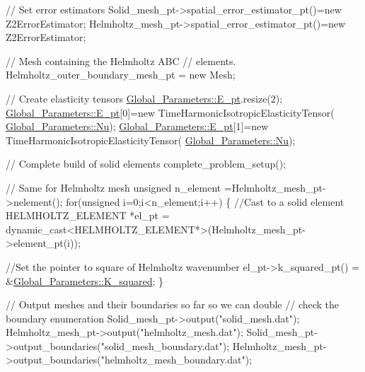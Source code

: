 \begin{DoxyCodeInclude}
 \textcolor{comment}{// Set error estimators}
 Solid\_mesh\_pt->spatial\_error\_estimator\_pt()=\textcolor{keyword}{new} Z2ErrorEstimator;
 Helmholtz\_mesh\_pt->spatial\_error\_estimator\_pt()=\textcolor{keyword}{new} Z2ErrorEstimator;

 \textcolor{comment}{// Mesh containing the Helmholtz ABC}
 \textcolor{comment}{// elements. }
 Helmholtz\_outer\_boundary\_mesh\_pt = \textcolor{keyword}{new} Mesh;

 \textcolor{comment}{// Create elasticity tensors}
 \hyperlink{namespaceGlobal__Parameters_a73c731fa617a9d92851e4195493262e7}{Global\_Parameters::E\_pt}.resize(2);
 \hyperlink{namespaceGlobal__Parameters_a73c731fa617a9d92851e4195493262e7}{Global\_Parameters::E\_pt}[0]=\textcolor{keyword}{new} TimeHarmonicIsotropicElasticityTensor(
    \hyperlink{namespaceGlobal__Parameters_a20fccdcfa2c15ad8b951b9ada3bb1661}{Global\_Parameters::Nu});
 \hyperlink{namespaceGlobal__Parameters_a73c731fa617a9d92851e4195493262e7}{Global\_Parameters::E\_pt}[1]=\textcolor{keyword}{new} TimeHarmonicIsotropicElasticityTensor(
  \hyperlink{namespaceGlobal__Parameters_a20fccdcfa2c15ad8b951b9ada3bb1661}{Global\_Parameters::Nu});

 \textcolor{comment}{// Complete build of solid elements}
 complete\_problem\_setup();

 \textcolor{comment}{// Same for Helmholtz mesh}
 \textcolor{keywordtype}{unsigned} n\_element =Helmholtz\_mesh\_pt->nelement();
 \textcolor{keywordflow}{for}(\textcolor{keywordtype}{unsigned} i=0;i<n\_element;i++)
  \{
   \textcolor{comment}{//Cast to a solid element}
   HELMHOLTZ\_ELEMENT *el\_pt = 
    \textcolor{keyword}{dynamic\_cast<}HELMHOLTZ\_ELEMENT*\textcolor{keyword}{>}(Helmholtz\_mesh\_pt->element\_pt(i));

   \textcolor{comment}{//Set the pointer to square of Helmholtz wavenumber}
   el\_pt->k\_squared\_pt() = &\hyperlink{namespaceGlobal__Parameters_a91a3fa265abaf9e724c668ee800ffb29}{Global\_Parameters::K\_squared};
  \}

 \textcolor{comment}{// Output meshes and their boundaries so far so we can double }
 \textcolor{comment}{// check the boundary enumeration}
 Solid\_mesh\_pt->output(\textcolor{stringliteral}{"solid\_mesh.dat"});
 Helmholtz\_mesh\_pt->output(\textcolor{stringliteral}{"helmholtz\_mesh.dat"});
 Solid\_mesh\_pt->output\_boundaries(\textcolor{stringliteral}{"solid\_mesh\_boundary.dat"});
 Helmholtz\_mesh\_pt->output\_boundaries(\textcolor{stringliteral}{"helmholtz\_mesh\_boundary.dat"});


\end{DoxyCodeInclude}
